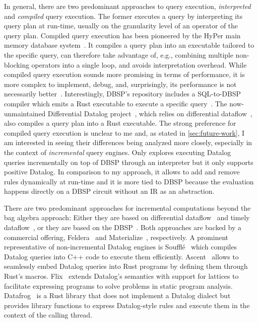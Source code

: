 In general, there are two predominant approaches to query execution,
\emph{interpreted} and \emph{compiled} query execution.
The former executes a query by interpreting its query plan at run-time,
usually on the granularity level of an operator of the query plan.
Compiled query execution has been pioneered by the HyPer main memory database
system~\cite{neumann2011efficiently}.
It compiles a query plan into an executable tailored to the specific query,
can therefore take advantage of, e.g., combining multiple non-blocking operators
into a single loop, and avoids interpretation overhead.
While compiled query execution sounds more promising in terms of performance,
it is more complex to implement, debug, and, surprisingly, its performance
is not necessarily better~\cite{kersten2018everything}.
Interestingly, DBSP's repository includes a SQL-to-DBSP compiler which emits
a Rust executable to execute a specific query~\cite{felderarepo}.
The now-unmaintained Differential Datalog project~\cite{ddlog, ddlogpaper},
which relies on differential dataflow~\cite{mcsherry2013differential},
also compiles a query plan into a Rust executable.
The strong preference for compiled query execution is unclear to me and,
as stated in \ref{sec:future-work}, I am interested in seeing their differences
being analyzed more closely, especially in the context of \emph{incremental}
query engines.
Only \cite{dynamicdatalog} explores executing Datalog queries incrementally
on top of DBSP through an interpreter but it only supports positive Datalog.
In comparison to my approach, it allows to add and remove rules dynamically
at run-time and it is more tied to DBSP because the evaluation happens
directly on a DBSP circuit without an \ac{IR} as an abstraction.

There are two predominant approaches for incremental computations beyond
the bag algebra approach:
Either they are based on differential dataflow~\cite{mcsherry2013differential}
and timely dataflow~\cite{timelydataflow}, or they are based on
the DBSP~\cite{budiu2024dbsp, budiu2025dbsp}.
Both approaches are backed by a commercial offering,
Feldera~\cite{felderainc} and Materialize~\cite{materializeinc}, respectively.
A prominent representative of non-incremental Datalog engines is
Soufflé~\cite{souffle} which compiles Datalog queries into C++ code to execute
them efficiently.
Ascent~\cite{ascent} allows to seamlessly embed Datalog queries into Rust
programs by defining them through Rust's macros.
Flix~\cite{flix} extends Datalog's semantics with support for lattices to
facilitate expressing programs to solve problems in static program analysis.
Datafrog~\cite{datafrog} is a Rust library that does not implement a Datalog
dialect but provides library functions to express Datalog-style rules and
execute them in the context of the calling thread.
